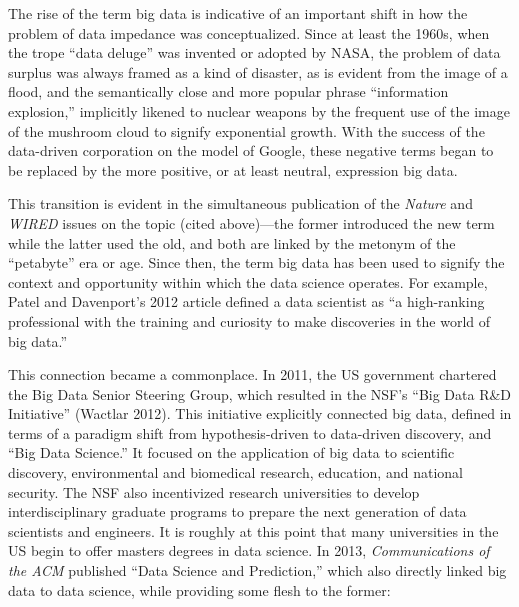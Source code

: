 \documentclass[
  letterpaper,
]{report}
\begin{document}
The rise of the term big data is indicative of an important shift in how
the problem of data impedance was conceptualized. Since at least the
1960s, when the trope ``data deluge'' was invented or adopted by NASA,
the problem of data surplus was always framed as a kind of disaster, as
is evident from the image of a flood, and the semantically close and
more popular phrase ``information explosion,'' implicitly likened to
nuclear weapons by the frequent use of the image of the mushroom cloud
to signify exponential growth. With the success of the data-driven
corporation on the model of Google, these negative terms began to be
replaced by the more positive, or at least neutral, expression big data.

This transition is evident in the simultaneous publication of the
\emph{Nature} and \emph{WIRED} issues on the topic (cited above)---the
former introduced the new term while the latter used the old, and both
are linked by the metonym of the ``petabyte'' era or age. Since then,
the term big data has been used to signify the context and opportunity
within which the data science operates. For example, Patel and
Davenport's 2012 article defined a data scientist as ``a high-ranking
professional with the training and curiosity to make discoveries in the
world of big data.''

This connection became a commonplace. In 2011, the US government
chartered the Big Data Senior Steering Group, which resulted in the
NSF's ``Big Data R\&D Initiative'' (Wactlar 2012). This initiative
explicitly connected big data, defined in terms of a paradigm shift from
hypothesis-driven to data-driven discovery, and ``Big Data Science.'' It
focused on the application of big data to scientific discovery,
environmental and biomedical research, education, and national security.
The NSF also incentivized research universities to develop
interdisciplinary graduate programs to prepare the next generation of
data scientists and engineers. It is roughly at this point that many
universities in the US begin to offer masters degrees in data science.
In 2013, \emph{Communications of the ACM} published ``Data Science and
Prediction,'' which also directly linked big data to data science, while
providing some flesh to the former:
\end{document}
